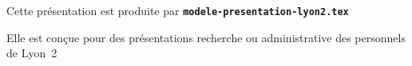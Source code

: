   \item Cette présentation est produite par \texttt{\textbf{modele-presentation-lyon2.tex}}
  \item Elle est conçue pour des présentations recherche ou administrative des personnels de Lyon~2
